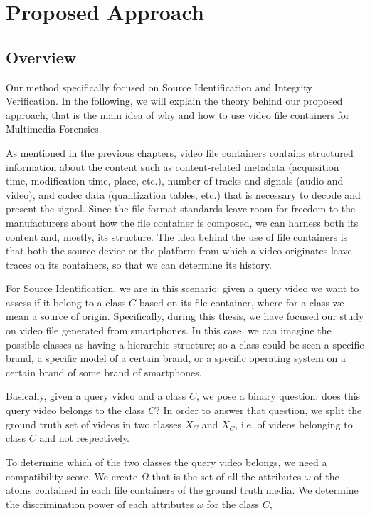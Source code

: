 \chapter{Proposed Approach}

\section{Overview}

Our method specifically focused on Source Identification and Integrity Verification. In the following, we will explain the theory behind our proposed approach, that is the main idea of why and how to use video file containers for Multimedia Forensics.

As mentioned in the previous chapters, video file containers contains structured information about the content such as content-related metadata (acquisition time, modification time, place, etc.), number of tracks and signals (audio and video), and codec data (quantization tables, etc.) that is necessary to decode and present the signal. Since the file format standards leave room for freedom to the manufacturers about how the file container is composed, we can harness both its content and, mostly, its structure. The idea behind the use of file containers is that both the source device or the platform from which a video originates leave traces on its containers, so that we can determine its history.

For Source Identification, we are in this scenario: given a query video we want to assess if it belong to a class $C$ based on its file container, where for a class we mean a source of origin. Specifically, during this thesis, we have focused our study on video file generated from smartphones. In this case, we can imagine the possible classes as having a hierarchic structure; so a class could be seen a specific brand, a specific model of a certain brand, or a specific operating system on a certain brand of some brand of smartphones.

Basically, given a query video and a class $C$, we pose a binary question: does this query video belongs to the class $C$? In order to answer that question, we split the ground truth set of videos in two classes $X_{C}$ and $X_{\overline{C}}$, i.e. of videos belonging to class $C$ and not respectively.

To determine which of the two classes the query video belongs, we need a compatibility score. We create $\Omega$ that is the set of all the attributes $\omega$ of the atoms contained in each file containers of the ground truth media. We determine the discrimination power of each attributes $\omega$ for the class $C$,

